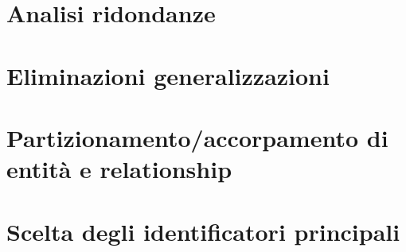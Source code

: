 \section{Analisi ridondanze}
	
	
\section{Eliminazioni generalizzazioni}


\section{Partizionamento/accorpamento di entità e relationship}


\section{Scelta degli identificatori principali}

